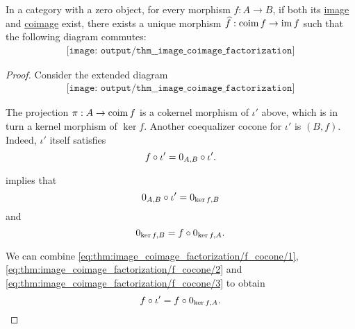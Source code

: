 \begin{theorem}\label{thm:image_coimage_factorization}
  In a category with a zero object, for every morphism \( f: A \to B \), if both its \hyperref[def:zero_morphisms/image]{image} and \hyperref[def:zero_morphisms/coimage]{coimage} exist, there exists a unique morphism \( \widehat{f}: \operatorname*{co\negthinspace\operatorname{im}} f \to \operatorname{im} f \) such that the following diagram commutes:
  \begin{equation*}
    \begin{aligned}
      \texttt{[image: output/thm\_\_image\_coimage\_factorization]}
    \end{aligned}
  \end{equation*}
\end{theorem}
\begin{proof}
  Consider the extended diagram
  \begin{equation*}
    \begin{aligned}
      \texttt{[image: output/thm\_\_image\_coimage\_factorization]}
    \end{aligned}
  \end{equation*}


  The projection \( \pi: A \to \operatorname*{co\negthinspace\operatorname{im}} f \) is a cokernel morphism of \( \iota' \) above, which is in turn a kernel morphism of \( \ker f \). Another coequalizer cocone for \( \iota' \) is \( (B, f) \). Indeed, \( \iota' \) itself satisfies
  \begin{equation}\label{eq:thm:image_coimage_factorization/f_cocone/1}
    f \bincirc \iota' = 0_{A, B} \bincirc \iota'.
  \end{equation}

   implies that
  \begin{equation}\label{eq:thm:image_coimage_factorization/f_cocone/2}
    0_{A, B} \bincirc \iota' = 0_{\ker f, B}
  \end{equation}
  and
  \begin{equation}\label{eq:thm:image_coimage_factorization/f_cocone/3}
    0_{\ker f, B} = f \bincirc 0_{\ker f, A}.
  \end{equation}

  We can combine \eqref{eq:thm:image_coimage_factorization/f_cocone/1}, \eqref{eq:thm:image_coimage_factorization/f_cocone/2} and \eqref{eq:thm:image_coimage_factorization/f_cocone/3} to obtain
  \begin{equation*}
    f \bincirc \iota' = f \bincirc 0_{\ker f, A}.
  \end{equation*}


\end{proof}
